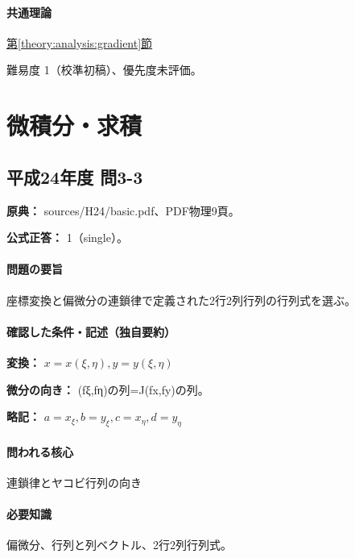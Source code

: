 \paragraph{共通理論} \hyperref[theory:analysis:gradient]{第\ref*{theory:analysis:gradient}節}

\par 難易度 1（校準初稿）、優先度未評価。

\section{微積分・求積}

\subsection{平成24年度 問3-3}
\label{q:h24-reg-basic-3-3}

\noindent\textbf{原典：} sources/H24/basic.pdf、PDF物理9頁。

\textbf{公式正答：} 1（single）。

\paragraph{問題の要旨} 座標変換と偏微分の連鎖律で定義された2行2列行列の行列式を選ぶ。

\paragraph{確認した条件・記述（独自要約）}\mbox{}\par

\noindent\textbf{変換：} \(x=x(\xi,\eta),y=y(\xi,\eta)\)\par

\noindent\textbf{微分の向き：} (fξ,fη)の列=J(fx,fy)の列。\par

\noindent\textbf{略記：} \(a=x_\xi,b=y_\xi,c=x_\eta,d=y_\eta\)\par

\paragraph{問われる核心} 連鎖律とヤコビ行列の向き

\paragraph{必要知識} 偏微分、行列と列ベクトル、2行2列行列式。

